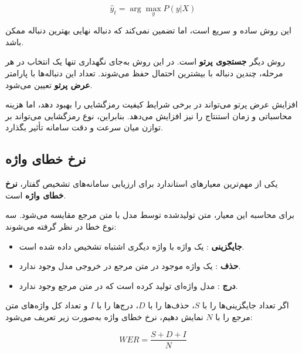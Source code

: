 \begin{equation}
\hat{y}_t
=
\arg\max_y P(y|X)
\end{equation}

این روش ساده و سریع است، اما تضمین نمی‌کند که دنباله نهایی
بهترین دنباله ممکن باشد.

روش دیگر
\textbf{جستجوی پرتو}
است.
در این روش به‌جای نگهداری تنها یک انتخاب در هر مرحله، چندین
دنباله با بیشترین احتمال حفظ می‌شوند.
تعداد این دنباله‌ها با پارامتر
\textbf{عرض پرتو}
تعیین می‌شود.

افزایش عرض پرتو می‌تواند در برخی شرایط کیفیت رمزگشایی را
بهبود دهد، اما هزینه محاسباتی و زمان استنتاج را نیز افزایش
می‌دهد.
بنابراین، نوع رمزگشایی می‌تواند بر توازن میان سرعت و دقت
سامانه تأثیر بگذارد.


\subsection{نرخ خطای واژه}

یکی از مهم‌ترین معیارهای استاندارد برای ارزیابی سامانه‌های
تشخیص گفتار،
\textbf{نرخ خطای واژه}
است.

برای محاسبه این معیار، متن تولیدشده توسط مدل با متن مرجع
مقایسه می‌شود.
سه نوع خطا در نظر گرفته می‌شوند:

\begin{itemize}

    \item
    \textbf{جایگزینی}
    :
    یک واژه با واژه دیگری اشتباه تشخیص داده شده است.

    \item
    \textbf{حذف}
    :
    یک واژه موجود در متن مرجع در خروجی مدل وجود ندارد.

    \item
    \textbf{درج}
    :
    مدل واژه‌ای تولید کرده است که در متن مرجع وجود ندارد.

\end{itemize}

اگر تعداد جایگزینی‌ها را با $S$، حذف‌ها را با $D$،
درج‌ها را با $I$ و تعداد کل واژه‌های متن مرجع را با $N$
نمایش دهیم، نرخ خطای واژه به‌صورت زیر تعریف می‌شود:

\begin{equation}
WER
=
\frac{S+D+I}{N}
\end{equation}

